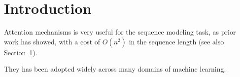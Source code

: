\documentclass{article}
\begin{document}
\section{Introduction}\label{sec:intro}

Attention mechanisms is very useful for the sequence modeling task, as prior
work \citep{vaswani2017attention} has showed, with a cost of $O(n^2)$ in the
sequence length (see also Section~\ref{sec:intro}).

They has been adopted widely across many domains of machine learning.
\end{document}
